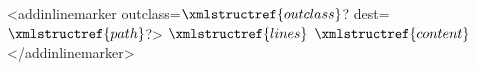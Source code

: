 <addinlinemarker outclass=$\xmlstructref{outclass}$? dest=$\xmlstructref{path}$?>
  $\xmlstructref{lines}$
  $\xmlstructref{content}$
</addinlinemarker>
